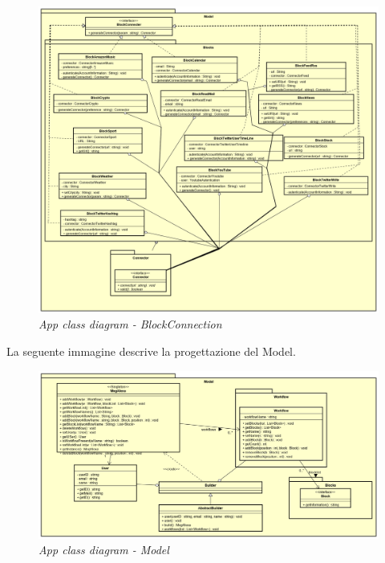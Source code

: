 \begin{figure} [H]
	\centering
	\includegraphics[scale=0.3]{./images/BlockConnection.png}
	\caption{\textit{App class diagram - BlockConnection}}\label{BlockConnection}
\end{figure}
\newpage
La seguente immagine descrive la progettazione del Model.
\begin{figure} [H]
	\centering
	\includegraphics[scale=0.3]{./images/Model.png}
	\caption{\textit{App class diagram - Model}}\label{Model}
\end{figure}
